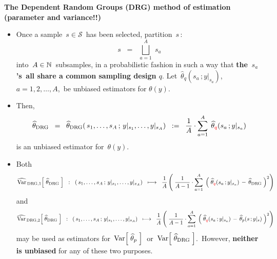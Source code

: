 \vskip 0.5cm
\noindent
\textbf{The Dependent Random Groups (DRG) method of estimation (parameter and variance!!)}
\begin{itemize}
\item
	Once a sample \,$s \in \mathcal{S}$\, has been selected, partition \,$s$\,:
	\begin{equation*}
	s \;\; = \;\; \overset{A}{\underset{a = 1}{\bigsqcup}}\;s_{a}
	\end{equation*}
	into \,$A \in \mathbb{N}$\, subsamples, in a probabilistic fashion in such a way that
	\textbf{\color{red}the \,$s_{a}$'s\, all share a common sampling design $q$}.
	Let \,$\widehat{\theta}_{q}(s_{a}\,;y\vert_{s_{a}})$,\, $a = 1,2,\ldots,A$,\, be unbiased estimators
	for $\theta(y)$.
\item
	Then,
	\begin{equation*}
	\widehat{\theta}_{\textnormal{DRG}}
	\;\; = \;\;
		\widehat{\theta}_{\textnormal{DRG}}(\,s_{1},\ldots,s_{A}\,;\,y\vert_{s_{1}},\ldots,y\vert_{s_{A}})
	\;\; := \;\;
		\dfrac{1}{A}\cdot\overset{A}{\underset{a=1}{\sum}}\;\,\widehat{\theta}_{\color{red}q}(s_{a}\,;y\vert_{s_{a}})
	\end{equation*}
	is an unbiased estimator for \,$\theta(y)$.
\item
	Both
	\begin{equation*}
	\widehat{\textnormal{Var}}_{\,\textnormal{DRG},1}\!\left[\;\widehat{\theta}_{\textnormal{DRG}}\;\right]
	\;\; : \;\;
		(\,s_{1},\ldots,s_{A}\,;\,y\vert_{s_{1}},\ldots,y\vert_{s_{A}})
	\;\; \longmapsto \;\;
		\dfrac{1}{A}
		\left(\;
			\dfrac{1}{A-1}\cdot
			\overset{A}{\underset{a=1}{\sum}}\;
			\left(\;\widehat{\theta}_{\color{red}q}(s_{a}\,;y\vert_{s_{a}}) \,-\, \widehat{\theta}_{\textnormal{DRG}}\;\right)^{2}
			\right)
	\end{equation*}
	and
	\begin{equation*}
	\widehat{\textnormal{Var}}_{\,\textnormal{DRG},2}\!\left[\;\widehat{\theta}_{\textnormal{DRG}}\;\right]
	\;\; : \;\;
		(\,s_{1},\ldots,s_{A}\,;\,y\vert_{s_{1}},\ldots,y\vert_{s_{A}})
	\;\; \longmapsto \;\;
		\dfrac{1}{A}
		\left(\;
			\dfrac{1}{A-1}\cdot
			\overset{A}{\underset{a=1}{\sum}}\;
			\left(\;\widehat{\theta}_{\color{red}q}(s_{a}\,;y\vert_{s_{a}}) \,-\, \widehat{\theta}_{p}(s\,;y\vert_{s})\;\right)^{2}
			\right)
	\end{equation*}
	may be used as estimators for
	\,$\textnormal{Var}\!\left[\;\widehat{\theta}_{p}\;\right]$\,
	or
	\,$\textnormal{Var}\!\left[\;\widehat{\theta}_{\textnormal{DRG}}\;\right]$.\,
	However, \textbf{\color{red}neither is unbiased} for any of these two purposes.
\end{itemize}

